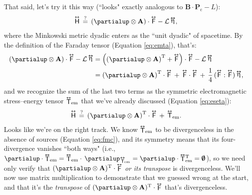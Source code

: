 \documentclass[12pt]{article}
\renewcommand{\vv}[1]{\mathbf{#1}}
\newcommand{\tightoverset}[2]{%
  \mathop{#2}\limits^{\vbox to -.5ex{\kern-0.75ex\hbox{$#1$}\vss}}}
\newcommand{\inlinedy}[1]{\tightoverset{\text{\tiny$\bm\leftrightarrow$}}{#1}}
\newcommand{\fnoverset}[2]{%
  \mathop{#2}\limits^{\vbox to -.5ex{\kern-0.85ex\hbox{$#1$}\vss}}}
\newcommand{\footnotedy}[1]{\fnoverset{\text{\tiny$\bm\leftrightarrow$}}{#1}}
\newcommand{\capdy}[1]{ \overset{ \text{\tiny$\bm\leftrightarrow$} }{\vphantom{\text{\small{A}}}\smash{#1}} }
\begin{document}
That said, let's try it this way (``looks" exactly analogous to $\vv B \cdot \vv P_{\mathrm{c}} - L$):
\begin{equation*}
\capdy{\mathsf{H}} \, \stackrel{?}{=} \, \left( \partialup \otimes \vv A \right) \cdot \capdy{\mathsf{F}} - \mathcal{L} \inlinedy{\upeta} ,
\end{equation*}
where the Minkowski metric dyadic enters as the ``unit dyadic" of spacetime. By the definition of the Faraday tensor (Equation \ref{eq:emta}), that's:
\begin{equation*}
\begin{split}
\left( \partialup \otimes \vv A \right) \cdot \capdy{\mathsf{F}} - \mathcal{L} \inlinedy{\upeta} &=  \left( \left( \partialup \otimes \vv A \right)^\mathrm{T} + \capdy{\mathsf{F}} \right) \cdot \capdy{\mathsf{F}} - \mathcal{L} \inlinedy{\upeta} \\
&= \left( \partialup \otimes \vv A \right)^\mathrm{T} \cdot \capdy{\mathsf{F}} \, + \, \capdy{\mathsf{F}} \cdot \capdy{\mathsf{F}} \, + \, \dfrac{1}{4} \, ( \capdy{\mathsf{F}} : \capdy{\mathsf{F}} ) \inlinedy{\upeta},
\end{split}
\end{equation*}
and we recognize the sum of the last two terms as the symmetric electromagnetic stress--energy tensor ${\inlinedy{\mathsf{T}}}_{\textrm{em}}$ that we've already discussed (Equation \ref{eq:eseta}):
\begin{equation*}
\capdy{\mathsf{H}} \, \stackrel{?}{=} \, \left( \partialup \otimes \vv A \right)^\mathrm{T} \cdot \capdy{\mathsf{F}} \, + \, \capdy{\mathsf{T}}_{\textrm{em}} .
\end{equation*}
Looks like we're on the right track. We know ${\inlinedy{\mathsf{T}}}_{\textrm{em}}$ to be divergenceless in the absence of sources (Equation \ref{eq:fmc}), and its symmetry means that its four-divergence vanishes ``both ways" (i.e., ${\partialup \cdot {\inlinedy{\mathsf{T}}}_{\textrm{em}} = {\inlinedy{\mathsf{T}}}_{\textrm{em}} \cdot \, \partialup _{{\footnotedy{\mathsf{T}}}\mkern-3mu_{\textrm{em}}} = \partialup \cdot {\inlinedy{\mathsf{T}}} {}^{\mathrm{T}}_{\textrm{em}} = \textrm{\mbox{\boldmath $\emptyset$}}}$), so we need only verify that $( \partialup \otimes \vv A )^\mathrm{T} \cdot \inlinedy{\mathsf{F}}$ \emph{or its transpose} is divergenceless. We'll now use matrix multiplication to demonstrate that we guessed wrong at the start, and that it's the \emph{transpose} of $( \partialup \otimes \vv A )^\mathrm{T} \cdot \inlinedy{\mathsf{F}}$ that's divergenceless.
\end{document}
